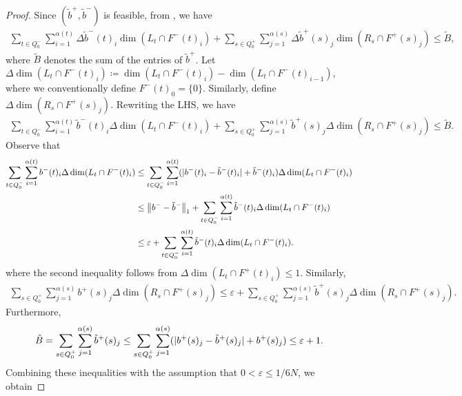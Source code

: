 \documentclass[a4paper,11pt]{article}
\numberwithin{equation}{section}
\newcommand{\eps}{\varepsilon}
\DeclarePairedDelimiter{\norm}{\lVert}{\rVert}
\DeclarePairedDelimiter{\abs}{\lvert}{\rvert}
\begin{document}
\begin{proof}
    Since $(\tilde b^+, \tilde b^-)$ is feasible, from , we have
    \begin{align}
        \sum_{t \in Q_0^-}\sum_{i=1}^{\alpha(t)} \Delta \tilde b^-(t)_i \dim(L_t \cap F^-(t)_i) +  \sum_{s \in Q_0^+} \sum_{j=1}^{\alpha(s)} \Delta \tilde b^+(s)_j \dim(R_s \cap F^+(s)_j) \leq \tilde B,
    \end{align}
    where $\tilde B$ denotes the sum of the entries of $\tilde b^+$.
    Let $\Delta \dim(L_t \cap F^-(t)_i) \coloneqq \dim(L_t \cap F^-(t)_i) - \dim(L_t \cap F^-(t)_{i-1})$, where we conventionally define $F^-(t)_0 = \{0\}$.
    Similarly, define $\Delta \dim(R_s \cap F^+(s)_j)$.
    Rewriting the LHS, we have
    \begin{align}
        \sum_{t \in Q_0^-}\sum_{i=1}^{\alpha(t)} \tilde b^-(t)_i \Delta \dim(L_t \cap F^-(t)_i)
         +  \sum_{s \in Q_0^+} \sum_{j=1}^{\alpha(s)} \tilde b^+(s)_j \Delta \dim(R_s \cap F^+(s)_j) \leq \tilde B.
    \end{align}
    Observe that
    \begin{align}
        \sum_{t \in Q_0^-}\sum_{i=1}^{\alpha(t)} b^-(t)_i \Delta \dim(L_t \cap F^-(t)_i)
         &\leq \sum_{t \in Q_0^-}\sum_{i=1}^{\alpha(t)} (\abs{b^-(t)_i - \tilde b^-(t)_i} + \tilde b^-(t)_i) \Delta \dim(L_t \cap F^-(t)_i) \\
         &\leq \norm[\big]{b^- - \tilde b^-}_1 + \sum_{t \in Q_0^-}\sum_{i=1}^{\alpha(t)}\tilde b^-(t)_i \Delta \dim(L_t \cap F^-(t)_i) \\
         &\leq \eps + \sum_{t \in Q_0^-}\sum_{i=1}^{\alpha(t)}\tilde b^-(t)_i \Delta \dim(L_t \cap F^-(t)_i). 
    \end{align}
    where the second inequality follows from $\Delta \dim(L_t \cap F^+(t)_i) \leq 1$.
    Similarly,
    \begin{align}
        \sum_{s \in Q_0^+}\sum_{j=1}^{\alpha(s)} b^+(s)_j \Delta \dim(R_s \cap F^+(s)_j)
        \leq \eps + \sum_{s \in Q_0^+}\sum_{j=1}^{\alpha(s)} \tilde b^+(s)_j \Delta \dim(R_s \cap F^+(s)_j).
    \end{align}
    Furthermore,
    \begin{align}
        \tilde B = \sum_{s \in Q_0^+} \sum_{j=1}^{\alpha(s)} \tilde b^+(s)_j 
                 \leq \sum_{s \in Q_0^+} \sum_{j=1}^{\alpha(s)} (\abs{b^+(s)_j - \tilde b^+(s)_j} + b^+(s)_j) 
                 \leq \eps + 1.
    \end{align}
    Combining these inequalities with the assumption that $0 < \eps \leq 1/6N$, we obtain

\end{proof}
\end{document}
